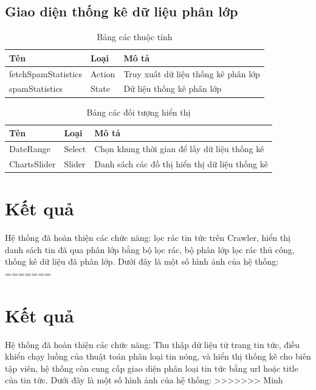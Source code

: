   \subsection{Giao diện thống kê dữ liệu phân lớp}
  \begin{table}[H]
    \centering
    \setlength{\tabcolstep}{12pt}
    \begin{tabular}{@{}lll@{}} \toprule
      Tên  & Loại   & Mô tả \\ \midrule
      fetchSpamStatistics &  Action   &  Truy xuất dữ liệu thống kê phân lớp \\
      spamStatistics  &  State  & Dữ liệu thống kê phân lớp \\ \bottomrule
    \end{tabular}
    \caption{Bảng các thuộc tính}
  \end{table}

  \begin{table}[H]
    \centering
    \setlength{\tabcolstep}{12pt}
    \begin{tabular}{@{}lll@{}} \toprule
      Tên  & Loại   & Mô tả \\ \midrule
      DateRange   &  Select & Chọn khung thời gian để lấy dữ liệu thống kê \\
      ChartsSlider   & Slider &  Danh sách các đồ thị hiển thị dữ liệu thống kê \\ \bottomrule
    \end{tabular}
    \caption{Bảng các đối tượng hiển thị}
  \end{table}
\section{Kết quả}
Hệ thống đã hoàn thiện các chức năng: lọc rác tin tức trên Crawler, hiển thị danh sách tin đã qua phân lớp bằng bộ lọc rác, bộ phân lớp lọc rác thủ công, thống kê dữ liệu đã phân lớp. Dưới đây là một số hình ảnh của hệ thống:
=======
\section{Kết quả}
Hệ thống đã hoàn thiện các chức năng: Thu thập dữ liệu từ trang tin tức, điều khiển chạy luồng của thuật toán phân loại tin nóng, và hiển thị thống kê cho biên tập viên, hệ thống còn cung cấp giao diện phân loại tin tức bằng url hoặc title của tin tức. Dưới đây là một số hình ảnh của hệ thống:
>>>>>>> Minh

